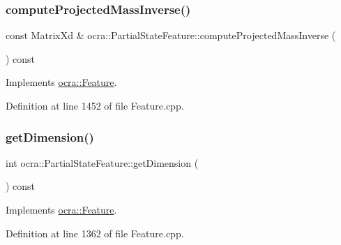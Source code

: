 \subsubsection{\texorpdfstring{compute\+Projected\+Mass\+Inverse()}{computeProjectedMassInverse()}\hspace{0.1cm}{\footnotesize\ttfamily [2/2]}}
{\footnotesize\ttfamily const Matrix\+Xd \& ocra\+::\+Partial\+State\+Feature\+::compute\+Projected\+Mass\+Inverse (\begin{DoxyParamCaption}{ }\end{DoxyParamCaption}) const\hspace{0.3cm}{\ttfamily [virtual]}}



Implements \hyperlink{classocra_1_1Feature_ac27bcbdbb8541e3b4e2c77a6d6f2ffc0}{ocra\+::\+Feature}.



Definition at line 1452 of file Feature.\+cpp.

\hypertarget{classocra_1_1PartialStateFeature_a15b65bc093b9578fc60c04490e0dd73d}{}\label{classocra_1_1PartialStateFeature_a15b65bc093b9578fc60c04490e0dd73d} 
\subsubsection{\texorpdfstring{get\+Dimension()}{getDimension()}}
{\footnotesize\ttfamily int ocra\+::\+Partial\+State\+Feature\+::get\+Dimension (\begin{DoxyParamCaption}{ }\end{DoxyParamCaption}) const\hspace{0.3cm}{\ttfamily [virtual]}}



Implements \hyperlink{classocra_1_1Feature_aeda4c2a5ffe638c3de30f8b91a11450e}{ocra\+::\+Feature}.



Definition at line 1362 of file Feature.\+cpp.

\hypertarget{classocra_1_1PartialStateFeature_ac22525347f868a352d4fa2cab69a12d6}{}\label{classocra_1_1PartialStateFeature_ac22525347f868a352d4fa2cab69a12d6} 

